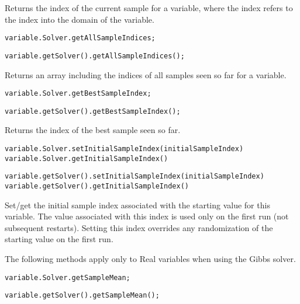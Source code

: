 Returns the index of the current sample for a variable, where the index refers to the index into the domain of the variable.

\ifmatlab
\begin{lstlisting}
variable.Solver.getAllSampleIndices;
\end{lstlisting}
\fi

\ifjava
\begin{lstlisting}
variable.getSolver().getAllSampleIndices();
\end{lstlisting}
\fi

Returns an array including the indices of all samples seen so far for a variable.

\ifmatlab
\begin{lstlisting}
variable.Solver.getBestSampleIndex;
\end{lstlisting}
\fi

\ifjava
\begin{lstlisting}
variable.getSolver().getBestSampleIndex();
\end{lstlisting}
\fi

Returns the index of the best sample seen so far.


\ifmatlab
\begin{lstlisting}
variable.Solver.setInitialSampleIndex(initialSampleIndex)
variable.Solver.getInitialSampleIndex()
\end{lstlisting}
\fi

\ifjava
\begin{lstlisting}
variable.getSolver().setInitialSampleIndex(initialSampleIndex)
variable.getSolver().getInitialSampleIndex()
\end{lstlisting}
\fi

Set/get the initial sample index associated with the starting value for this variable.  The value associated with this index is used only on the first run (not subsequent restarts).  Setting this index overrides any randomization of the starting value on the first run.


The following methods apply only to Real variables when using the Gibbs solver.

\ifmatlab
\begin{lstlisting}
variable.Solver.getSampleMean;
\end{lstlisting}
\fi

\ifjava
\begin{lstlisting}
variable.getSolver().getSampleMean();
\end{lstlisting}
\fi

